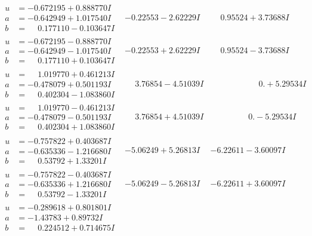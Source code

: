 \documentclass[1p]{elsarticle_modified}
\theoremstyle{definition}
\begin{document}
$$\begin{array}{c|c|c}
\begin{aligned}
u &= -0.672195 + 0.888770 I \\
a &= -0.642949 + 1.017540 I \\
b &= \phantom{-}0.177110 - 0.103647 I\end{aligned}
 & -0.22553 - 2.62229 I & \phantom{-}0.95524 + 3.73688 I \\ \hline\begin{aligned}
u &= -0.672195 - 0.888770 I \\
a &= -0.642949 - 1.017540 I \\
b &= \phantom{-}0.177110 + 0.103647 I\end{aligned}
 & -0.22553 + 2.62229 I & \phantom{-}0.95524 - 3.73688 I \\ \hline\begin{aligned}
u &= \phantom{-}1.019770 + 0.461213 I \\
a &= -0.478079 + 0.501193 I \\
b &= \phantom{-}0.402304 - 1.083860 I\end{aligned}
 & \phantom{-}3.76854 - 4.51039 I & \phantom{-0.000000 -}0. + 5.29534 I \\ \hline\begin{aligned}
u &= \phantom{-}1.019770 - 0.461213 I \\
a &= -0.478079 - 0.501193 I \\
b &= \phantom{-}0.402304 + 1.083860 I\end{aligned}
 & \phantom{-}3.76854 + 4.51039 I & \phantom{-0.000000 } 0. - 5.29534 I \\ \hline\begin{aligned}
u &= -0.757822 + 0.403687 I \\
a &= -0.635336 - 1.216680 I \\
b &= \phantom{-}0.53792 + 1.33201 I\end{aligned}
 & -5.06249 + 5.26813 I & -6.22611 - 3.60097 I \\ \hline\begin{aligned}
u &= -0.757822 - 0.403687 I \\
a &= -0.635336 + 1.216680 I \\
b &= \phantom{-}0.53792 - 1.33201 I\end{aligned}
 & -5.06249 - 5.26813 I & -6.22611 + 3.60097 I \\ \hline\begin{aligned}
u &= -0.289618 + 0.801801 I \\
a &= -1.43783 + 0.89732 I \\
b &= \phantom{-}0.224512 + 0.714675 I\end{aligned}

\end{array}$$
\end{document}
